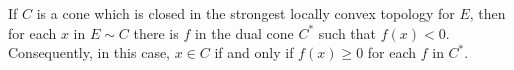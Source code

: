 If $C$ is a cone which is closed in the strongest locally convex topology for $E$, then for each $x$ in $E \sim C$ there is $f$ in the dual cone $C^*$ such that $f(x) < 0$. Consequently, in this case, $x \in C$ if and only if $f(x) \geq 0$ for each $f$ in $C^*$.
